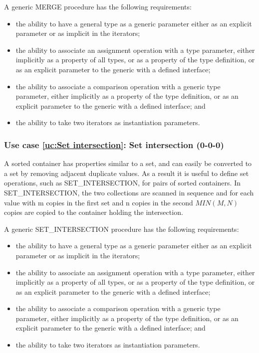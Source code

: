 \documentclass{article}
\newcounter{usecase}
\newcounter{requirement}
\newcommand{\newusecase}[2]{
\refstepcounter{usecase}\label{uc:#1}
\subsubsection{Use case \ref{uc:#1}: #1 (#2)}}
\begin{document}
A generic {\rm  MERGE} procedure has the following
requirements:
\begin{itemize}
\item the ability to have a general type as a generic parameter
  either as an explicit parameter or as implicit in the iterators;

\item the ability to associate an assignment operation with a type
  parameter, either implicitly as a property of all types, or
  as a property of the type definition, or as an explicit parameter to
  the generic with a defined interface;

\item the ability to associate a comparison operation with a generic
  type parameter, either implicitly
  as a property of the type definition, or as an explicit parameter to
  the generic with a defined interface; and

\item the ability to take two iterators as instantiation
  parameters.

\end{itemize}

\newusecase{Set  intersection}{0-0-0}
A sorted container has properties similar to a set, and can easily be
converted to a set by removing adjacent duplicate values.  As a result
it is useful to define set operations, such as {\rm SET\_INTERSECTION},
for pairs of sorted containers.  In {\rm SET\_INTERSECTION}, the two
collections are scanned in sequence and for each value with m
copies in the first set and n copies in the second $MIN(M,N)$ copies
are copied to the container holding the intersection.

A generic {\rm SET\_INTERSECTION} procedure has the following
requirements:
\begin{itemize}
\item the ability to have a general type as a generic parameter
  either as an explicit parameter or as implicit in the iterators;

\item the ability to associate an assignment operation with a type
  parameter, either implicitly as a property of all types, or
  as a property of the type definition, or as an explicit parameter to
  the generic with a defined interface;

\item the ability to associate a comparison operation with a generic
  type parameter, either implicitly
  as a property of the type definition, or as an explicit parameter to
  the generic with a defined interface; and

\item the ability to take two iterators as instantiation
  parameters.

\end{itemize}
\end{document}

